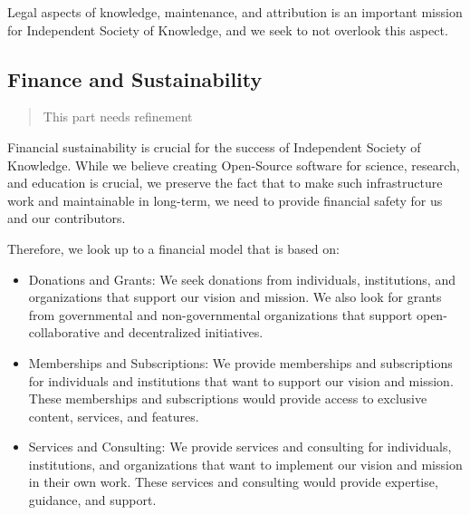 Legal aspects of knowledge, maintenance, and attribution is an important mission for Independent Society of Knowledge, and we seek to not overlook this aspect.

\subsection{Finance and Sustainability}\label{subsec:finance-and-sustainability}
\begin{quotation}
    This part needs refinement
\end{quotation}
Financial sustainability is crucial for the success of Independent Society of Knowledge.
While we believe creating Open-Source software for science, research, and education is crucial, we preserve the fact that to make such infrastructure work and maintainable in long-term, we need to provide financial safety for us and our contributors.

Therefore, we look up to a financial model that is based on:
\begin{itemize}
    \item Donations and Grants: We seek donations from individuals, institutions, and organizations that support our vision and mission.
    We also look for grants from governmental and non-governmental organizations that support open-collaborative and decentralized initiatives.
    \item Memberships and Subscriptions: We provide memberships and subscriptions for individuals and institutions that want to support our vision and mission.
    These memberships and subscriptions would provide access to exclusive content, services, and features.
    \item Services and Consulting: We provide services and consulting for individuals, institutions, and organizations that want to implement our vision and mission in their own work.
    These services and consulting would provide expertise, guidance, and support.
\end{itemize}